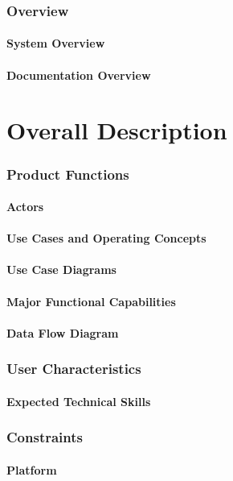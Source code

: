 \documentclass[11pt]{article}
\begin{document}
\section{Overview}
\subsection{System Overview}
\subsection{Documentation Overview}

\newpage
\part{Overall Description}
\section{Product Functions}
\subsection{Actors}
\subsection{Use Cases and Operating Concepts}
\subsection{Use Case Diagrams}
\subsection{Major Functional Capabilities}
\subsection{Data Flow Diagram}
\section{User Characteristics}
\subsection{Expected Technical Skills}
\section{Constraints}
\subsection{Platform}
\end{document}
